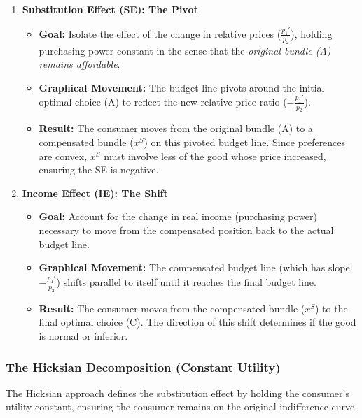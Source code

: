 \documentclass{article}
\begin{document}
\begin{enumerate}
    \item \textbf{Substitution Effect (SE): The Pivot}
    \begin{itemize}
        \item \textbf{Goal:} Isolate the effect of the change in relative prices ($\frac{p_1'}{p_2}$), holding purchasing power constant in the sense that the \textit{original bundle (A) remains affordable}.
        \item \textbf{Graphical Movement:} The budget line pivots around the initial optimal choice (A) to reflect the new relative price ratio ($-\frac{p_1'}{p_2}$).
        \item \textbf{Result:} The consumer moves from the original bundle (A) to a compensated bundle ($x^S$) on this pivoted budget line. Since preferences are convex, $x^S$ must involve less of the good whose price increased, ensuring the SE is negative.
    \end{itemize}
    \item \textbf{Income Effect (IE): The Shift}
    \begin{itemize}
        \item \textbf{Goal:} Account for the change in real income (purchasing power) necessary to move from the compensated position back to the actual budget line.
        \item \textbf{Graphical Movement:} The compensated budget line (which has slope $-\frac{p_1'}{p_2}$) shifts parallel to itself until it reaches the final budget line.
        \item \textbf{Result:} The consumer moves from the compensated bundle ($x^S$) to the final optimal choice (C). The direction of this shift determines if the good is normal or inferior.
    \end{itemize}
\end{enumerate}

\subsubsection*{The Hicksian Decomposition (Constant Utility)}

The Hicksian approach defines the substitution effect by holding the consumer's utility constant, ensuring the consumer remains on the original indifference curve.
\end{document}
